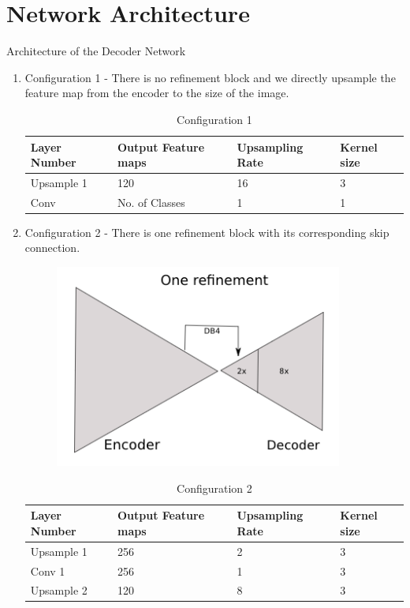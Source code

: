 \documentclass[a4paper, 12pt]{article}
\begin{document}
\section{Network Architecture}
Architecture of the Decoder Network
\begin{enumerate}
	\item Configuration 1 - There is no refinement block and we directly upsample the feature map from the encoder to the size of the image.
		\begin{table}[h]
			\caption{Configuration 1}
			\begin{tabular}{|l|l|l|l|}
				\hline
				\textbf{Layer Number} & \textbf{Output Feature maps} & \textbf{Upsampling Rate} & \textbf{Kernel size} \\
				\hline
				Upsample 1 & 120 & 16 & 3\\
				\hline
				Conv & No. of Classes & 1 & 1\\
				\hline
			\end{tabular}
		\end{table}
	\item Configuration 2 - There is one refinement block with its corresponding skip connection.
	\begin{figure}[h]
		\centering
		\includegraphics[height= 0.1\textheight]{onerefinement}
		\label{image1-onerefinement}
	\end{figure}
	\begin{table}[h]
		\caption{Configuration 2}
		\begin{tabular}{|l|l|l|l|}
			\hline
			\textbf{Layer Number} & \textbf{Output Feature maps} & \textbf{Upsampling Rate} & \textbf{Kernel size} \\
			\hline
			Upsample 1 & 256 & 2 & 3\\
			\hline
			Conv 1& 256 & 1 & 3\\
			\hline
			Upsample 2& 120 & 8 & 3\\

\end{tabular}
\end{table}
\end{enumerate}
\end{document}
